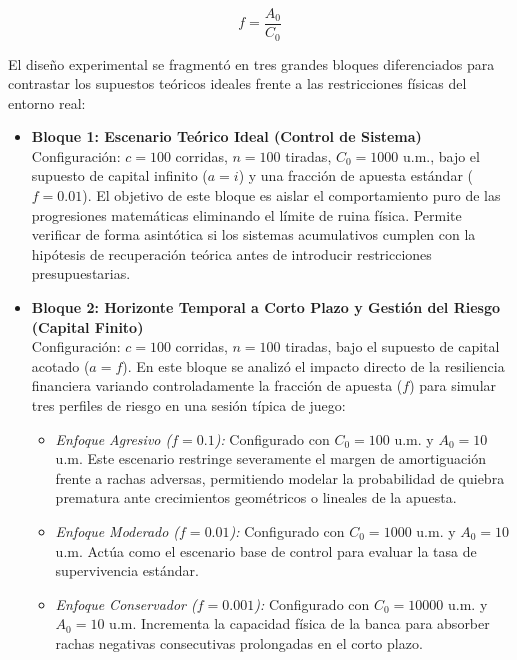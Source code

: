 \documentclass{article}
\begin{document}
\begin{equation}
f = \frac{A_0}{C_0}
\end{equation}

El diseño experimental se fragmentó en tres grandes bloques diferenciados para contrastar los supuestos teóricos ideales frente a las restricciones físicas del entorno real:

\begin{itemize}
    \item \textbf{Bloque 1: Escenario Teórico Ideal (Control de Sistema)} \\
    Configuración: $c = 100$ corridas, $n = 100$ tiradas, $C_0 = 1000$ u.m., bajo el supuesto de capital infinito ($a = i$) y una fracción de apuesta estándar ($f = 0.01$). El objetivo de este bloque es aislar el comportamiento puro de las progresiones matemáticas eliminando el límite de ruina física. Permite verificar de forma asintótica si los sistemas acumulativos cumplen con la hipótesis de recuperación teórica antes de introducir restricciones presupuestarias.
    
    \item \textbf{Bloque 2: Horizonte Temporal a Corto Plazo y Gestión del Riesgo (Capital Finito)} \\
    Configuración: $c = 100$ corridas, $n = 100$ tiradas, bajo el supuesto de capital acotado ($a = f$). En este bloque se analizó el impacto directo de la resiliencia financiera variando controladamente la fracción de apuesta ($f$) para simular tres perfiles de riesgo en una sesión típica de juego:
    \begin{itemize}
        \item \textit{Enfoque Agresivo ($f = 0.1$):} Configurado con $C_0 = 100$ u.m. y $A_0 = 10$ u.m. Este escenario restringe severamente el margen de amortiguación frente a rachas adversas, permitiendo modelar la probabilidad de quiebra prematura ante crecimientos geométricos o lineales de la apuesta.
        \item \textit{Enfoque Moderado ($f = 0.01$):} Configurado con $C_0 = 1000$ u.m. y $A_0 = 10$ u.m. Actúa como el escenario base de control para evaluar la tasa de supervivencia estándar.
        \item \textit{Enfoque Conservador ($f = 0.001$):} Configurado con $C_0 = 10000$ u.m. y $A_0 = 10$ u.m. Incrementa la capacidad física de la banca para absorber rachas negativas consecutivas prolongadas en el corto plazo.
    \end{itemize}


\end{itemize}
\end{document}
